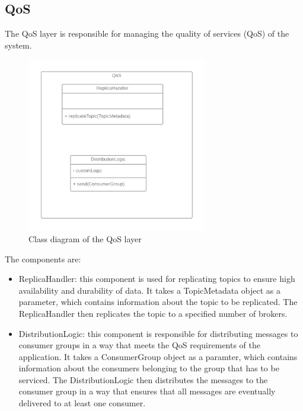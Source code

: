 \subsection{QoS}

The QoS layer is responsible for managing the quality of services (QoS) of the
system.

\begin{figure}[H]
    \centering
    \includegraphics[width=0.7\textwidth]{Figures/class_diagram_QoS.png}
    \caption{Class diagram of the QoS layer}
\end{figure}

The components are:

\begin{itemize}
    \item   ReplicaHandler: this component is used for replicating topics to
            ensure high availability and durability of data. It takes a
            TopicMetadata object as a parameter, which contains information
            about the topic to be replicated. The ReplicaHandler then
            replicates the topic to a specified number of brokers.
    \item   DistributionLogic: this component is responsible for distributing
            messages to consumer groups in a way that meets the QoS
            requirements of the application. It takes a ConsumerGroup object
            as a paramter, which contains information about the consumers
            belonging to the group that has to be serviced.
            The DistributionLogic then distributes the messages to the consumer
            group in a way that ensures that all messages are eventually
            delivered to at least one consumer.
\end{itemize}

